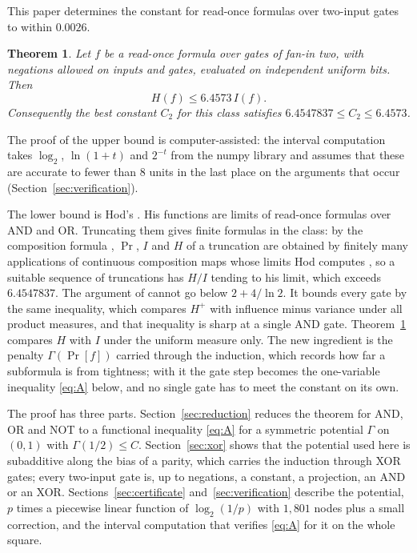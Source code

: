 \documentclass[11pt]{amsart}
\newtheorem{theorem}{Theorem}[section]
\theoremstyle{remark}
\renewcommand{\Pr}{\operatorname{Pr}}
\begin{document}
This paper determines the constant for read-once formulas over two-input gates to within $0.0026$.

\begin{theorem}\label{thm:main}
Let $f$ be a read-once formula over gates of fan-in two, with negations allowed on inputs and gates, evaluated on independent uniform bits. Then
\[
H(f)\le 6.4573\, I(f).
\]
Consequently the best constant $C_2$ for this class satisfies $6.4547837\le C_2\le 6.4573$.
\end{theorem}

The proof of the upper bound is computer-assisted: the interval computation takes $\log_2$, $\ln(1+t)$ and $2^{-t}$ from the numpy library and assumes that these are accurate to fewer than $8$ units in the last place on the arguments that occur (Section~\ref{sec:verification}).


The lower bound is Hod's \cite[Theorem 4.4]{Hod17}. His functions are limits of read-once formulas over AND and OR. Truncating them gives finite formulas in the class: by the composition formula \cite[Lemma 3.1]{Hod17}, $\Pr$, $I$ and $H$ of a truncation are obtained by finitely many applications of continuous composition maps whose limits Hod computes \cite[Proposition 4.1]{Hod17}, so a suitable sequence of truncations has $H/I$ tending to his limit, which exceeds $6.4547837$. The argument of \cite{Shm26} cannot go below $2+4/\ln 2$. It bounds every gate by the same inequality, which compares $H^+$ with influence minus variance under all product measures, and that inequality is sharp at a single AND gate. Theorem~\ref{thm:main} compares $H$ with $I$ under the uniform measure only. The new ingredient is the penalty $\Gamma(\Pr[f])$ carried through the induction, which records how far a subformula is from tightness; with it the gate step becomes the one-variable inequality \eqref{eq:A} below, and no single gate has to meet the constant on its own.

The proof has three parts. Section~\ref{sec:reduction} reduces the theorem for AND, OR and NOT to a functional inequality \eqref{eq:A} for a symmetric potential $\Gamma$ on $(0,1)$ with $\Gamma(1/2)\le C$. Section~\ref{sec:xor} shows that the potential used here is subadditive along the bias of a parity, which carries the induction through XOR gates; every two-input gate is, up to negations, a constant, a projection, an AND or an XOR. Sections~\ref{sec:certificate} and~\ref{sec:verification} describe the potential, $p$ times a piecewise linear function of $\log_2(1/p)$ with $1{,}801$ nodes plus a small correction, and the interval computation that verifies \eqref{eq:A} for it on the whole square.
\end{document}

